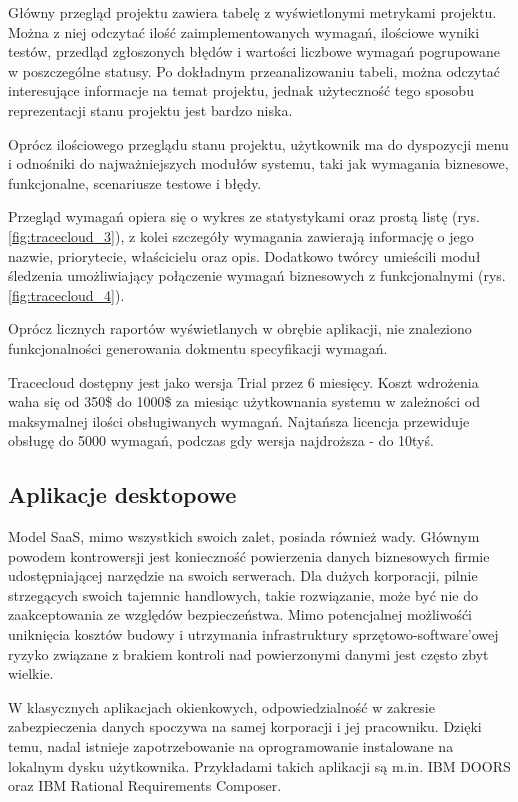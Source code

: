         Główny przegląd projektu zawiera tabelę z wyświetlonymi metrykami projektu. Można z niej odczytać ilość zaimplementowanych wymagań, ilościowe wyniki testów, przedląd zgłoszonych błędów i wartości liczbowe wymagań pogrupowane w poszczególne statusy. Po dokładnym przeanalizowaniu tabeli, można odczytać interesujące informacje na temat projektu, jednak użyteczność tego sposobu reprezentacji stanu projektu jest bardzo niska. 

        Oprócz ilościowego przeglądu stanu projektu, użytkownik ma do dyspozycji menu i odnośniki do najważniejszych modułów systemu, taki jak wymagania biznesowe, funkcjonalne, scenariusze testowe i błędy.

        Przegląd wymagań opiera się o wykres ze statystykami oraz prostą listę (rys. \ref{fig:tracecloud_3}), z kolei szczegóły wymagania zawierają informację o jego nazwie, priorytecie, właścicielu oraz opis. Dodatkowo twórcy umieścili moduł śledzenia umożliwiający połączenie wymagań biznesowych z funkcjonalnymi (rys. \ref{fig:tracecloud_4}).
    
        Oprócz licznych raportów wyświetlanych w obrębie aplikacji, nie znaleziono funkcjonalności generowania dokmentu specyfikacji wymagań. 

        Tracecloud dostępny jest jako wersja Trial przez 6 miesięcy. Koszt wdrożenia waha się od 350\$ do 1000\$ za miesiąc użytkownania systemu w zależności od maksymalnej ilości obsługiwanych wymagań. Najtańsza licencja przewiduje obsługę do 5000 wymagań, podczas gdy wersja najdroższa - do 10tyś.

    \subsection{Aplikacje desktopowe}

      Model SaaS, mimo wszystkich swoich zalet, posiada również wady. Głównym powodem kontrowersji jest konieczność powierzenia danych biznesowych firmie udostępniającej narzędzie na swoich serwerach. Dla dużych korporacji, pilnie strzegących swoich tajemnic handlowych, takie rozwiązanie, może być nie do zaakceptowania ze względów bezpieczeństwa. Mimo potencjalnej możliwośći uniknięcia kosztów budowy i utrzymania infrastruktury sprzętowo-software'owej ryzyko związane z brakiem kontroli nad powierzonymi danymi jest często zbyt wielkie. 

      W klasycznych aplikacjach okienkowych, odpowiedzialność w zakresie zabezpieczenia danych spoczywa na samej korporacji i jej pracowniku. Dzięki temu, nadal istnieje zapotrzebowanie na oprogramowanie instalowane na lokalnym dysku użytkownika. Przykładami takich aplikacji są m.in. IBM DOORS oraz IBM Rational Requirements Composer.

